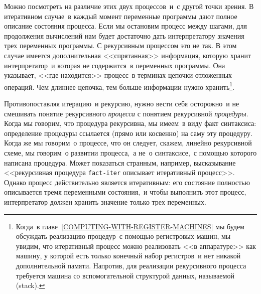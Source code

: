 Можно посмотреть на различие этих двух процессов~и~с другой 
точки зрения. В итеративном случае~в каждый момент переменные
программы дают полное описание состояния процесса.  Если мы остановим
процесс между шагами, для продолжения вычислений нам будет достаточно
дать интерпретатору значения трех переменных программы. С рекурсивным 
процессом это не так. В этом случае имеется дополнительная
<<спрятанная>> информация, которую хранит интерпретатор~и которая не
содержится~в переменных программы.  Она указывает, <<где находится>>
процесс~в терминах цепочки отложенных операций.  Чем длиннее цепочка,
тем больше информации нужно хранить\footnote{Когда~в главе~\ref{COMPUTING-WITH-REGISTER-MACHINES} мы будем
обсуждать реализацию процедур~с помощью регистровых машин, мы увидим,
что итеративный процесс можно реализовать <<в аппаратуре>> как машину, 
у которой есть только конечный набор регистров~и нет никакой
дополнительной памяти.  Напротив, для реализации рекурсивного процесса 
требуется машина со вспомогательной структурой данных,
называемой (stack).
}.

Противопоставляя итерацию~и рекурсию, нужно вести себя
осторожно~и не смешивать понятие рекурсивного  
% 
{\em процесса}
с понятием рекурсивной {\em процедуры}.  Когда мы говорим, что
процедура рекурсивна, мы имеем~в виду факт синтаксиса:
определение процедуры ссылается (прямо или косвенно) на саму эту
процедуру.  Когда же мы говорим~о процессе, что он следует, скажем,
линейно рекурсивной схеме, мы говорим~о развитии процесса,~а не~о 
синтаксисе,~с помощью которого написана процедура.  Может показаться
странным, например, высказывание <<рекурсивная процедура
{\tt fact-iter} описывает итеративный процесс>>.  Однако процесс
действительно является итеративным: его состояние полностью
описывается тремя переменными состояния,~и чтобы выполнить этот
процесс, интерпретатор должен хранить значение только трех
переменных.

